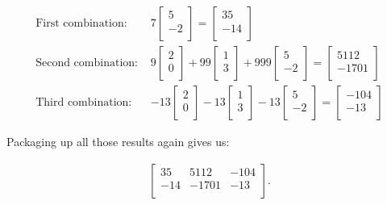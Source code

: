 \vspace{-.15in}
\begin{align*}
\text{First combination: } &7
\begin{bmatrix}
5 \\
-2 \\
\end{bmatrix} =
\begin{bmatrix}
35 \\
-14 \\
\end{bmatrix} \\
\text{Second combination: } &9
\begin{bmatrix}
2 \\
0 \\
\end{bmatrix} + 99
\begin{bmatrix}
1 \\
3 \\
\end{bmatrix} + 999
\begin{bmatrix}
5 \\
-2 \\
\end{bmatrix} =
\begin{bmatrix}
5112 \\
-1701 \\
\end{bmatrix} \\
\text{Third combination: } &-13
\begin{bmatrix}
2 \\
0 \\
\end{bmatrix} -13
\begin{bmatrix}
1 \\
3 \\
\end{bmatrix} -13
\begin{bmatrix}
5 \\
-2 \\
\end{bmatrix} =
\begin{bmatrix}
-104 \\
-13 \\
\end{bmatrix}
\end{align*}
\vspace{-.15in}

Packaging up all those results again gives us:

\vspace{-.15in}
\begin{align*}
\begin{bmatrix}
35 & 5112 & -104 \\
-14 & -1701 & -13 \\
\end{bmatrix}.
\end{align*}
\vspace{-.15in}

